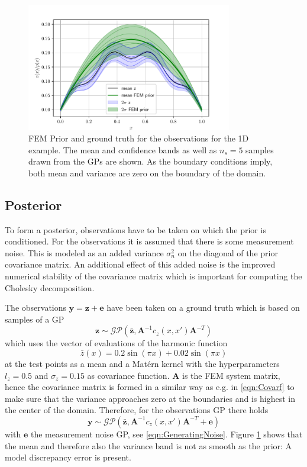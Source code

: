 \documentclass[%
  a4paper,oneside,%
  11pt,%
  smallchapters,
  style=printdev,
  extramargin,
  green,%
  rgb, <cmyk>
  ]{tubsbook}
\begin{document}
\begin{figure}[H]
\includegraphics[width=0.8\textwidth]{pics/FEMprior_Z.pdf}
\centering
\caption[FEM prior and ground truth GPs for the 1D example]{FEM Prior and ground truth for the observations for the 1D example. The mean and confidence bands as well as $n_s = 5$ samples drawn from the GPs are shown. As the boundary conditions imply, both mean and variance are zero on the boundary of the domain.}
\label{fig:FEMGP1D}
\end{figure}






\subsection{Posterior}
To form a posterior, observations have to be taken on which the prior is conditioned.
For the observations it is assumed that there is some measurement noise. This is modeled as an added variance $\sigma_{n}^2$ on the diagonal of the prior covariance matrix. An additional effect of this added noise is the improved numerical stability of the covariance matrix which is important for computing the Cholesky decomposition.

The observations $\bm{y} = \bm{z} +\bm{e}$ have been taken on a ground truth which is based on samples of a GP 
\begin{equation}
\bm{z} \sim \mathcal{GP}(\bar{\bm{z}},\bm{A}^{-1}c_z(x,x')\bm{A}^{-T})
\label{eqn:zGP}
\end{equation}
which uses the vector of evaluations of the harmonic function
\begin{equation}
\bar{z}(x) = 0.2\sin(\pi x) + 0.02\sin(\pi x)
\end{equation}
at the test points as a mean and a Mat\'ern kernel with the hyperparameters $l_z=0.5$ and $\sigma_z = 0.15$ as covariance function. $\bm{A}$ is the FEM system matrix, hence the covariance matrix is formed in a similar way as e.g. in \eqref{eqn:Covarf} to make sure that the variance approaches zero at the boundaries and is highest in the center of the domain. Therefore, for the observations GP there holds
\begin{equation}
\bm{y} \sim \mathcal{GP}(\bar{\bm{z}},\bm{A}^{-1}c_z(x,x')\bm{A}^{-T} + \bm{e})
\end{equation}
with $\bm{e}$ the measurement noise GP, see \eqref{eqn:GeneratingNoise}.
Figure \ref{fig:FEMGP1D} shows that the mean and therefore also the variance band is not as smooth as the prior: A model discrepancy error is present.
\end{document}
